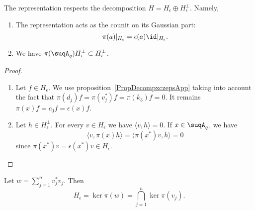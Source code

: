 \begin{lemma}       \label{LempiepsHepsUni}
    The representation respects the decomposition \(H=H_{\epsilon}\oplus H_{\epsilon}^{\perp}\). Namely,
    \begin{enumerate}
        \item
            The representation acts as the counit on its Gaussian part:
            \begin{equation}
                \pi(a)|_{H_{\epsilon}}=\epsilon(a)\id|_{H_{\epsilon}}.
            \end{equation}
        \item
            We have \(\pi(\suqA_q)H_{\epsilon}^{\perp}\subset H_{\epsilon}^{\perp}\).
    \end{enumerate}
\end{lemma}

\begin{proof}
    \begin{enumerate}
        \item
            Let $f\in H_{\epsilon}$. We use proposition~\ref{PropDecompxczepsApp} taking into account the fact that $\pi(d_j)f=\pi(v_j^*)f=\pi(k_3)f=0$. It remains $\pi(x)f=c_0f=\epsilon(x)f$.
        \item
            Let \(h\in H_{\epsilon}^{\perp}\). For every \(v\in H_{\epsilon}\) we have \(\langle v, h\rangle =0\). If \(x\in\suqA_q\), we have
            \begin{equation}
                \langle v, \pi(x)h\rangle =\langle \pi(x^*)v, h\rangle =0
            \end{equation}
            since \(\pi(x^*)v=\epsilon(x^*)v\in H_{\epsilon}\).
    \end{enumerate}
\end{proof}

\begin{proposition}
    Let $w=\sum_{j=1}^nv_j^*v_j$. Then
    \begin{equation}
        H_{\epsilon}=\ker\pi(w)=\bigcap_{j=1}^n\ker\pi(v_j).
    \end{equation}
\end{proposition}

